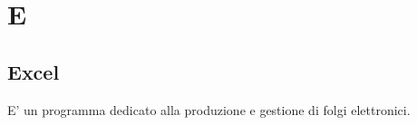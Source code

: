\section{E}
\subsection{Excel}
E' un programma dedicato alla produzione e gestione di folgi elettronici.
\clearpage